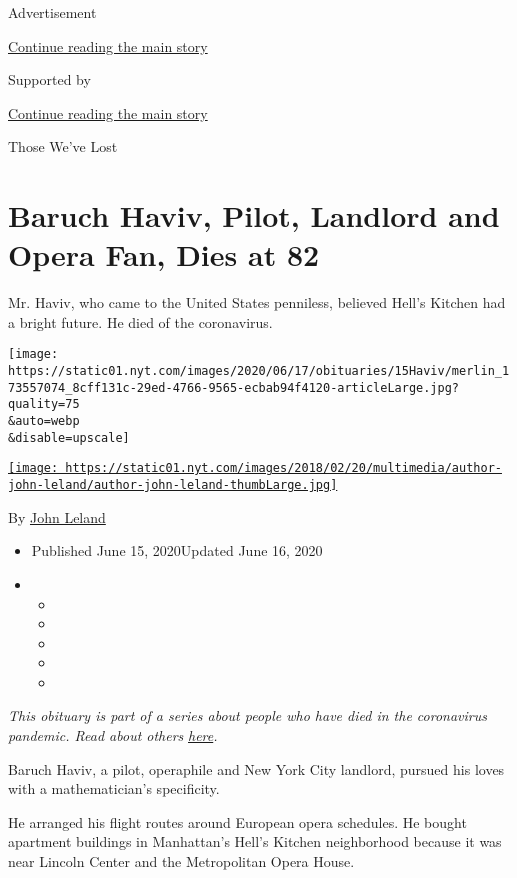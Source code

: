 Advertisement

\protect\hyperlink{after-top}{Continue reading the main story}

Supported by

\protect\hyperlink{after-sponsor}{Continue reading the main story}

Those We've Lost

\hypertarget{baruch-haviv-pilot-landlord-and-opera-fan-dies-at-82}{%
\section{Baruch Haviv, Pilot, Landlord and Opera Fan, Dies at
82}\label{baruch-haviv-pilot-landlord-and-opera-fan-dies-at-82}}

Mr. Haviv, who came to the United States penniless, believed Hell's
Kitchen had a bright future. He died of the coronavirus.

\texttt{[image: https://static01.nyt.com/images/2020/06/17/obituaries/15Haviv/merlin\_173557074\_8cff131c-29ed-4766-9565-ecbab94f4120-articleLarge.jpg?quality=75\\\&auto=webp\\\&disable=upscale]}

\href{https://www.nytimes.com/by/john-leland}{\texttt{[image: https://static01.nyt.com/images/2018/02/20/multimedia/author-john-leland/author-john-leland-thumbLarge.jpg]}}

By \href{https://www.nytimes.com/by/john-leland}{John Leland}

\begin{itemize}
\item
  Published June 15, 2020Updated June 16, 2020
\item
  \begin{itemize}
  \item
  \item
  \item
  \item
  \item
  \end{itemize}
\end{itemize}

\emph{This obituary is part of a series about people who have died in
the coronavirus pandemic. Read about others}
\href{https://www.nytimes.com/interactive/2020/obituaries/people-died-coronavirus-obituaries.html}{\emph{here}}\emph{.}

Baruch Haviv, a pilot, operaphile and New York City landlord, pursued
his loves with a mathematician's specificity.

He arranged his flight routes around European opera schedules. He bought
apartment buildings in Manhattan's Hell's Kitchen neighborhood because
it was near Lincoln Center and the Metropolitan Opera House.

